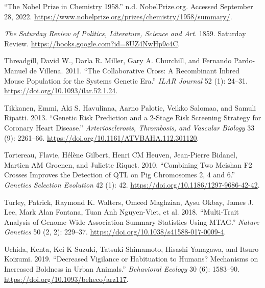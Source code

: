 \documentclass[
]{book}
\newlength{\cslhangindent}
\newlength{\cslentryspacingunit} %
\newenvironment{CSLReferences}[2] %
 {%
  \setlength{\parindent}{0pt}
  \ifodd #1
  \let\oldpar\par
  \def\par{\hangindent=\cslhangindent\oldpar}
  \fi
  \setlength{\parskip}{#2\cslentryspacingunit}
 }%
 {}
\begin{document}
\begin{CSLReferences}{1}{0}
\leavevmode{}%
{``The {Nobel Prize} in {Chemistry} 1958.''} n.d. {NobelPrize.org}. Accessed September 28, 2022. \url{https://www.nobelprize.org/prizes/chemistry/1958/summary/}.

\leavevmode{}%
\emph{The {Saturday Review} of {Politics}, {Literature}, {Science} and {Art}}. 1859. {Saturday Review}. \url{https://books.google.com?id=8UZ4NwHp9c4C}.

\leavevmode{}%
Threadgill, David W., Darla R. Miller, Gary A. Churchill, and Fernando Pardo-Manuel de Villena. 2011. {``The {Collaborative Cross}: {A Recombinant Inbred Mouse Population} for the {Systems Genetic Era}.''} \emph{ILAR Journal} 52 (1): 24--31. \url{https://doi.org/10.1093/ilar.52.1.24}.

\leavevmode{}%
Tikkanen, Emmi, Aki S. Havulinna, Aarno Palotie, Veikko Salomaa, and Samuli Ripatti. 2013. {``Genetic {Risk Prediction} and a 2-{Stage Risk Screening Strategy} for {Coronary Heart Disease}.''} \emph{Arteriosclerosis, Thrombosis, and Vascular Biology} 33 (9): 2261--66. \url{https://doi.org/10.1161/ATVBAHA.112.301120}.

\leavevmode{}%
Tortereau, Flavie, Hélène Gilbert, Henri CM Heuven, Jean-Pierre Bidanel, Martien AM Groenen, and Juliette Riquet. 2010. {``Combining Two {Meishan F2} Crosses Improves the Detection of {QTL} on Pig Chromosomes 2, 4 and 6.''} \emph{Genetics Selection Evolution} 42 (1): 42. \url{https://doi.org/10.1186/1297-9686-42-42}.

\leavevmode{}%
Turley, Patrick, Raymond K. Walters, Omeed Maghzian, Aysu Okbay, James J. Lee, Mark Alan Fontana, Tuan Anh Nguyen-Viet, et al. 2018. {``Multi-Trait Analysis of Genome-Wide Association Summary Statistics Using {MTAG}.''} \emph{Nature Genetics} 50 (2, 2): 229--37. \url{https://doi.org/10.1038/s41588-017-0009-4}.

\leavevmode{}%
Uchida, Kenta, Kei K Suzuki, Tatsuki Shimamoto, Hisashi Yanagawa, and Itsuro Koizumi. 2019. {``Decreased Vigilance or Habituation to Humans? {Mechanisms} on Increased Boldness in Urban Animals.''} \emph{Behavioral Ecology} 30 (6): 1583--90. \url{https://doi.org/10.1093/beheco/arz117}.


\end{CSLReferences}
\end{document}

